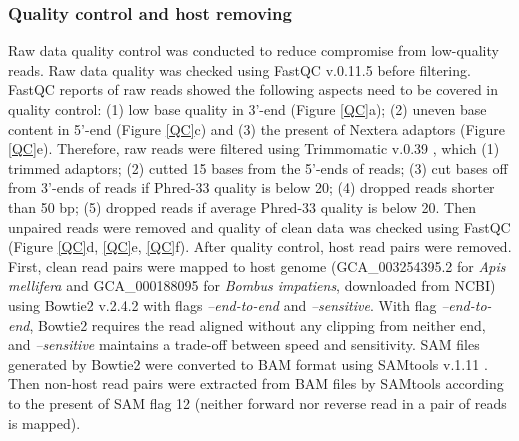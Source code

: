 \documentclass[11pt]{article}
\begin{document}
    \subsubsection{Quality control and host removing}
    \label{HostRemove}
    Raw data quality control was conducted to reduce compromise from low-quality reads.
    Raw data quality was checked using FastQC v.0.11.5 \citep{andrews2010fastqc} before filtering. 
    FastQC reports of raw reads showed the following aspects need to be covered in quality control: (1) low base quality in 3'-end (Figure \ref{QC}a); (2) uneven base content in 5'-end (Figure \ref{QC}c) and (3) the present of Nextera adaptors (Figure \ref{QC}e). 
    Therefore, raw reads were filtered using Trimmomatic v.0.39 \citep{bolger2014trimmomatic}, which (1) trimmed adaptors; (2) cutted 15 bases from the 5'-ends of reads; (3) cut bases off from 3'-ends of reads if Phred-33 quality is below 20; (4) dropped reads shorter than 50 bp; (5) dropped reads if average Phred-33 quality is below 20. 
    Then unpaired reads were removed and quality of clean data was checked using FastQC (Figure \ref{QC}d, \ref{QC}e, \ref{QC}f).
    \newline  
    After quality control, host read pairs were removed. 
    First, clean read pairs were mapped to host genome (GCA\_003254395.2 for \textit{Apis mellifera} and GCA\_000188095 for \textit{Bombus impatiens}, downloaded from NCBI) using Bowtie2 v.2.4.2 \citep{langmead2012fast} with flags \textit{--end-to-end} and \textit{--sensitive}. 
    With flag \textit{--end-to-end}, Bowtie2 requires the read aligned without any clipping from neither end, and \textit{--sensitive} maintains a trade-off between speed and sensitivity. 
    SAM files generated by Bowtie2 were converted to BAM format using SAMtools v.1.11 \citep{li2009sequence}. 
    Then non-host read pairs were extracted from BAM files by SAMtools according to the present of SAM flag 12 (neither forward nor reverse read in a pair of reads is mapped).
\end{document}
